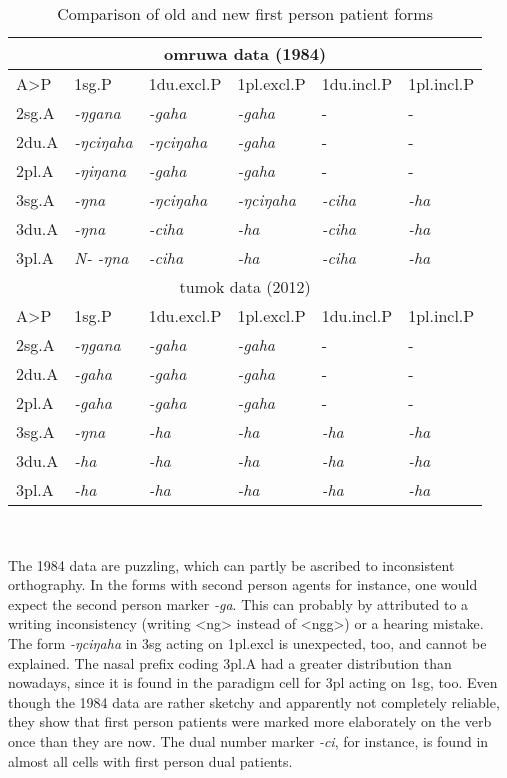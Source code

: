 \begin{table}[htp]
\begin{tabular}{llllll}
\toprule
\multicolumn{6}{c}{{\sc omruwa data (1984)}} \\
\midrule
	A>P			& {\sc 1sg.P}		&{\sc 1du.excl.P} &{\sc 1pl.excl.P}		&{\sc 1du.incl.P} &{\sc 1pl.incl.P}	\\
\midrule                                                                    
{\sc 2sg.A}&\emph{-ŋgana}	&\emph{-gaha}	&\emph{-gaha}			 & -					 &-						\\
{\sc 2du.A}&\emph{-ŋciŋaha}	&\emph{-ŋciŋaha} &\emph{-gaha}			 & -					 &-						\\
{\sc 2pl.A}&\emph{-ŋiŋana}	&\emph{-gaha}	&\emph{-gaha}			  & -					&-						\\
{\sc 3sg.A}&\emph{-ŋna}		&\emph{-ŋciŋaha}	 &\emph{-ŋciŋaha}	&  \emph{-ciha}& \emph{-ha}		\\
{\sc 3du.A}&\emph{-ŋna}		&\emph{-ciha}	&\emph{-ha}				&  \emph{-ciha}& \emph{-ha}		\\
{\sc 3pl.A}&\emph{N- -ŋna}	&\emph{-ciha}	&\emph{-ha}			&	  \emph{-ciha}& \emph{-ha}	\\
\midrule
\multicolumn{6}{c}{{\sc tumok data (2012)}} \\
\midrule
	A>P			& {\sc 1sg.P}&		{\sc 1du.excl.P}&{\sc 1pl.excl.P}	& {\sc 1du.incl.P} &{\sc 1pl.incl.P}	\\
\midrule                                                             
{\sc 2sg.A}&\emph{-ŋgana}	&\emph{-gaha	}	&\emph{-gaha}		&-					&-						\\
{\sc 2du.A}&\emph{-gaha}		&\emph{-gaha	}	&\emph{-gaha}		&-					&-						\\
{\sc 2pl.A}&\emph{-gaha}		&\emph{-gaha	}	&\emph{-gaha}		&-					&-						\\
{\sc 3sg.A}&\emph{-ŋna}		&\emph{-ha}	&\emph{-ha}			&\emph{-ha}	&\emph{-ha}	\\
{\sc 3du.A}&\emph{-ha}			&\emph{-ha}	&\emph{-ha}			&\emph{-ha}	&\emph{-ha}	\\
{\sc 3pl.A}&\emph{-ha}			&\emph{-ha}	&\emph{-ha}			&\emph{-ha}	&\emph{-ha}	\\
\bottomrule
\end{tabular}\\
\caption{Comparison of old and new first person patient forms}\label{omruwa}
\end{table}

The 1984 data are puzzling, which can partly be ascribed to inconsistent orthography. In the forms with second person agents for instance, one would expect the second person marker \emph{-ga}. This can probably by attributed to a writing inconsistency (writing <ng> instead of <ngg>) or a hearing mistake. The form \emph{-ŋciŋaha} in {\sc 3sg} acting on {\sc 1pl.excl} is unexpected, too, and cannot be explained. The nasal prefix coding {\sc 3pl.A} had a greater distribution than nowadays, since it is found in the paradigm cell for {\sc 3pl} acting on {\sc 1sg}, too. Even though the 1984 data are rather sketchy and apparently not completely reliable, they show that first person patients were marked more elaborately on the verb once than they are now. The dual number marker \emph{-ci}, for instance, is found in almost all cells with first person dual patients. 

